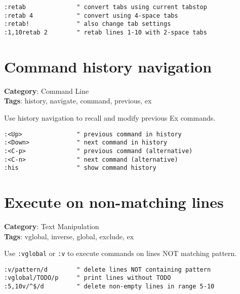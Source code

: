 {{{{{\begin{Exa*}{}
\begin{Verbatim}[fontsize=\footnotesize, breaklines, breakanywhere]
:retab              " convert tabs using current tabstop
:retab 4            " convert using 4-space tabs
:retab!             " also change tab settings
:1,10retab 2        " retab lines 1-10 with 2-space tabs
\end{Verbatim}
\end{Exa*}

\section{Command history navigation}

\textbf{Category}: Command Line\\ \textbf{Tags}: history, navigate, command, previous, ex
\vspace{0.5cm}

Use history navigation to recall and modify previous Ex commands.

\begin{Exa*}{}
\begin{Verbatim}[fontsize=\footnotesize, breaklines, breakanywhere]
:<Up>               " previous command in history
:<Down>             " next command in history
:<C-p>              " previous command (alternative)
:<C-n>              " next command (alternative)
:his                " show command history
\end{Verbatim}
\end{Exa*}

\section{Execute on non-matching lines}

\textbf{Category}: Text Manipulation\\ \textbf{Tags}: vglobal, inverse, global, exclude, ex
\vspace{0.5cm}

Use {\footnotesize \Verb§:vglobal§} or {\footnotesize \Verb§:v§} to execute commands on lines NOT matching pattern.

\begin{Exa*}{}
\begin{Verbatim}[fontsize=\footnotesize, breaklines, breakanywhere]
:v/pattern/d        " delete lines NOT containing pattern
:vglobal/TODO/p     " print lines without TODO
:5,10v/^$/d         " delete non-empty lines in range 5-10
\end{Verbatim}
\end{Exa*}

}}}}}
